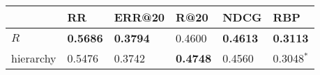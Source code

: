\begin{tabular}{llllll}
\toprule
{} &               RR &           ERR@20 &             R@20 &             NDCG &              RBP \\
\midrule
$R$       &  \textbf{0.5686} &  \textbf{0.3794} &             0.4600 &  \textbf{0.4613} &  \textbf{0.3113} \\
hierarchy &           0.5476 &           0.3742 &  \textbf{0.4748} &           0.4560 &     0.3048$^{*}$ \\
\bottomrule
\end{tabular}
